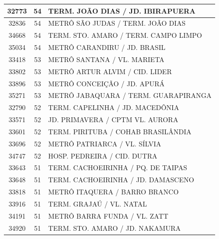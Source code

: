 \documentclass[
	12pt,				%
	oneside,			%
	a4paper,			%
	english,			%
	brazil				%
	]{abntex2ppgsi}
\begin{document}
{{\begin{apendicesenv}
\begin{longtable}{c|c|p{7cm}}
    32773 & 54    & TERM. JOÃO DIAS / JD. IBIRAPUERA \\
\hline

    32836 & 54    & METRÔ SÃO JUDAS / TERM. JOÃO DIAS \\
\hline

    34668 & 54    & TERM. STO. AMARO / TERM. CAMPO LIMPO \\
\hline

    35034 & 54    & METRÔ CARANDIRU / JD. BRASIL \\
\hline

    33418 & 53    & METRÔ SANTANA / VL. MARIETA \\
\hline

    33802 & 53    & METRÔ ARTUR ALVIM / CID. LIDER \\
\hline

    33896 & 53    & METRÔ CONCEIÇÃO / JD. APURÁ \\
\hline

    35271 & 53    & METRÔ JABAQUARA / TERM. GUARAPIRANGA \\
\hline

    32790 & 52    & TERM. CAPELINHA / JD. MACEDÔNIA \\
\hline

    33571 & 52    & JD. PRIMAVERA / CPTM VL. AURORA \\
\hline

    33601 & 52    & TERM. PIRITUBA / COHAB BRASILÂNDIA \\
\hline

    33696 & 52    & METRÔ PATRIARCA / VL. SÍLVIA \\
\hline

    34747 & 52    & HOSP. PEDREIRA / CID. DUTRA \\
\hline

    33643 & 51    & TERM. CACHOEIRINHA / PQ. DE TAIPAS \\
\hline

    33648 & 51    & TERM. CACHOEIRINHA / JD. DAMASCENO \\
\hline

    33818 & 51    & METRÔ ITAQUERA  / BARRO BRANCO \\
\hline

    33916 & 51    & TERM. GRAJAÚ / VL. NATAL \\
\hline

    34191 & 51    & METRÔ BARRA FUNDA / VL. ZATT \\
\hline

    34920 & 51    & TERM. STO. AMARO / JD. NAKAMURA \\
\hline


\end{longtable}
\end{apendicesenv}}}
\end{document}
